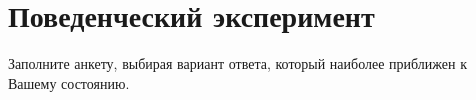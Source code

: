 \documentclass{../../shared/survey}
\begin{document}
\section*{\huge{Поведенческий эксперимент}}

\begin{flushleft}
Заполните анкету, выбирая вариант ответа, который наиболее приближен к Вашему состоянию.
\end{flushleft}
\end{document}
